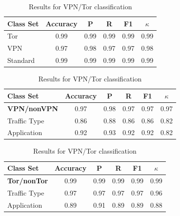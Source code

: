 \begin{table}
\centering
\begin{tabular}{| p{5cm} | c  c  c  c  c|}
\hline
 \textbf{Class Set} & \textbf{Accuracy} & \textbf{P} & \textbf{R} & \textbf{F1} & \textbf{$\kappa$} \\
 \hline
Tor & 0.99 & 0.99 & 0.99 & 0.99 & 0.99\\
VPN & 0.97 & 0.98 & 0.97 & 0.97 & 0.98 \\
Standard & 0.99 & 0.99 & 0.99 & 0.99 & 0.99\\
\hline
\end{tabular}

\begin{tabular}{| p{5cm} | c  c  c  c  c |}
\hline
 \textbf{Class Set} & \textbf{Accuracy} & \textbf{P} & \textbf{R} & \textbf{F1} & \textbf{$\kappa$} \\
 \hline
 \textbf{VPN/nonVPN} & 0.97 & 0.98 & 0.97 & 0.97 & 0.97 \\
 Traffic Type & 0.86 & 0.88 & 0.86 & 0.86 & 0.82 \\
 Application & 0.92 & 0.93 & 0.92 & 0.92 & 0.82 \\
 \hline
 \end{tabular}

\begin{tabular}{| p{5cm} | c  c  c  c  c |}
\hline
 \textbf{Class Set} & \textbf{Accuracy} & \textbf{P} & \textbf{R} & \textbf{F1} & \textbf{$\kappa$} \\
 \hline
 \textbf{Tor/nonTor} & 0.99 & 0.99 & 0.99 & 0.99 & 0.99 \\
 Traffic Type & 0.97 & 0.97 & 0.97 & 0.97 & 0.96 \\
 Application & 0.89 & 0.91 & 0.89 & 0.89 & 0.88 \\
 \hline
 \end{tabular}
\caption{Results for VPN/Tor classification}
\label{tab:classresults}
\end{table}

